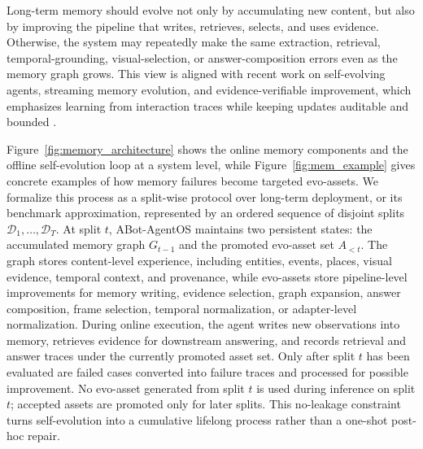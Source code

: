 Long-term memory should evolve not only by accumulating new content, but also by improving the pipeline that writes, retrieves, selects, and uses evidence.
Otherwise, the system may repeatedly make the same extraction, retrieval, temporal-grounding, visual-selection, or answer-composition errors even as the memory graph grows.
This view is aligned with recent work on self-evolving agents, streaming memory evolution, and evidence-verifiable improvement, which emphasizes learning from interaction traces while keeping updates auditable and bounded \cite{selfevolvingsurvey,evomemory,evolvemem,memevolve,reme,memskill,memma,evimem,eveagent}.



Figure~\ref{fig:memory_architecture} shows the online memory components and the offline self-evolution loop at a system level, while Figure~\ref{fig:mem_example} gives concrete examples of how memory failures become targeted evo-assets.
We formalize this process as a split-wise protocol over long-term deployment, or its benchmark approximation, represented by an ordered sequence of disjoint splits
$\mathcal{D}_1,\ldots,\mathcal{D}_T$.
At split $t$, ABot-AgentOS maintains two persistent states: the accumulated memory graph $G_{t-1}$ and the promoted evo-asset set $A_{<t}$.
The graph stores content-level experience, including entities, events, places, visual evidence, temporal context, and provenance, while evo-assets store pipeline-level improvements for memory writing, evidence selection, graph expansion, answer composition, frame selection, temporal normalization, or adapter-level normalization.
During online execution, the agent writes new observations into memory, retrieves evidence for downstream answering, and records retrieval and answer traces under the currently promoted asset set.
Only after split $t$ has been evaluated are failed cases converted into failure traces and processed for possible improvement.
No evo-asset generated from split $t$ is used during inference on split $t$; accepted assets are promoted only for later splits.
This no-leakage constraint turns self-evolution into a cumulative lifelong process rather than a one-shot post-hoc repair.


